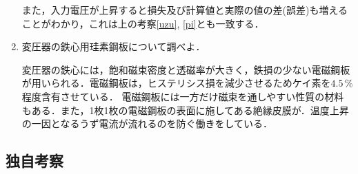 \begin{enumerate}[1.]
	また，入力電圧が上昇すると損失及び計算値と実際の値の差(誤差)も増えることがわかり，これは上の考察\ref{uzu}, \ref{pi}とも一致する．
	\item 変圧器の鉄心用珪素鋼板について調べよ．\cite{1130282270091060}
	
	変圧器の鉄心には，飽和磁束密度と透磁率が大きく，鉄損の少ない電磁鋼板が用いられる．電磁鋼板は，ヒステリシス損を減少させるためケイ素を$4.5\,\%$程度含有させている．
	電磁鋼板には一方だけ磁束を通しやすい性質の材料もある．また，1枚1枚の電磁鋼板の表面に施してある絶縁皮膜が．温度上昇の一因となるうず電流が流れるのを防ぐ働きをしている．
\end{enumerate}

\subsection{独自考察}

